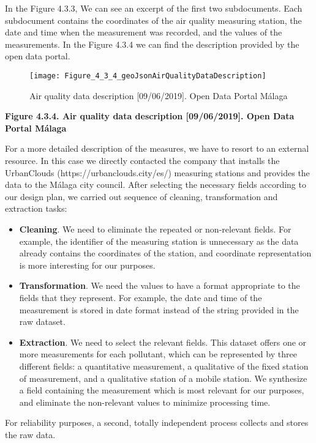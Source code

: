 In the Figure 4.3.3, We can see an excerpt of the first two subdocuments.
Each subdocument contains the coordinates of the air quality measuring station, the date and time when the measurement was recorded, and the values of the measurements.
In the Figure 4.3.4 we can find the description provided by the open data portal.\\
    
\begin{figure}[ht]
    \centering
    \texttt{[image: Figure\_4\_3\_4\_geoJsonAirQualityDataDescription]}
    \caption{Air quality data description [09/06/2019]. Open Data Portal Málaga}
\end{figure}
\begin{center}
    \bf{        
    Figure 4.3.4. Air quality data description [09/06/2019]. Open Data Portal Málaga}
\end{center}

For a more detailed description of the measures, we have to resort to an external resource.
In this case we directly contacted the company that installs the UrbanClouds (https://urbanclouds.city/es/) measuring stations and provides the data to the Málaga city council.
After selecting the necessary fields according to our design plan, we carried out sequence of cleaning, transformation and extraction tasks:

\begin{itemize}
    \item \textbf{Cleaning}. We need to eliminate the repeated or non-relevant fields.
        For example, the identifier of the measuring station is unnecessary as the data already contains the coordinates of the station, and coordinate representation is more interesting for our purposes.

    \item \textbf{Transformation}. We need the values to have a format appropriate to the fields that they represent.
        For example, the date and time of the measurement is stored in date format instead of the string provided in the raw dataset.

    \item \textbf{Extraction}. We need to select the relevant fields.
        This dataset offers one or more measurements for each pollutant, which can be represented by three different fields:
        a quantitative measurement, a qualitative of the fixed station of measurement, and a qualitative station of a mobile station.
        We synthesize a field containing the measurement which is most relevant for our purposes, and eliminate the non-relevant values to minimize processing time.
\end{itemize}

For reliability purposes, a second, totally independent process collects and stores the raw data.